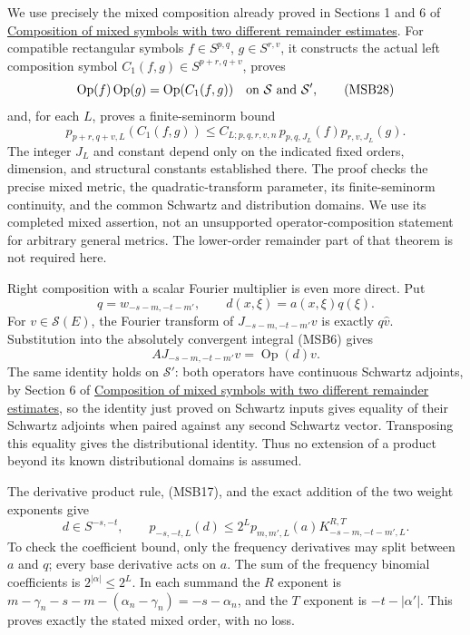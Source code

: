 \documentclass[
  11pt,
]{article}
\begin{document}
We use precisely the mixed composition already proved in Sections 1 and
6 of \href{mixed-symbol-composition.pdf}{Composition of mixed symbols
with two different remainder estimates}. For compatible rectangular
symbols \(f\in S^{p,q}\), \(g\in S^{r,v}\), it constructs the actual
left composition symbol \(C_1(f,g)\in S^{p+r,q+v}\), proves \[
 \operatorname{Op}(f)\operatorname{Op}(g)
       =\operatorname{Op}(C_1(f,g))\quad\hbox{on }\mathcal S\hbox{ and }\mathcal S',
 \tag{MSB28}
\] and, for each \(L\), proves a finite-seminorm bound \[
 p_{p+r,q+v,L}(C_1(f,g))
 \leq C_{L;p,q,r,v,n}\,p_{p,q,J_L}(f)p_{r,v,J_L}(g).
 \tag{MSB29}
\] The integer \(J_L\) and constant depend only on the indicated fixed
orders, dimension, and structural constants established there. The proof
checks the precise mixed metric, the quadratic-transform parameter, its
finite-seminorm continuity, and the common Schwartz and distribution
domains. We use its completed mixed assertion, not an unsupported
operator-composition statement for arbitrary general metrics. The
lower-order remainder part of that theorem is not required here.

Right composition with a scalar Fourier multiplier is even more direct.
Put \[
 q=w_{-s-m,-t-m'},\qquad d(x,\xi)=a(x,\xi)q(\xi).
 \tag{MSB30}
\] For \(v\in\mathcal S(E)\), the Fourier transform of
\(J_{-s-m,-t-m'}v\) is exactly \(q\widehat v\). Substitution into the
absolutely convergent integral (MSB6) gives \[
 A J_{-s-m,-t-m'}v=\operatorname{Op}(d)v.
 \tag{MSB31}
\] The same identity holds on \(\mathcal S'\): both operators have
continuous Schwartz adjoints, by Section 6 of
\href{mixed-symbol-composition.pdf}{Composition of mixed symbols with two
different remainder estimates}, so the identity just proved on Schwartz
inputs gives equality of their Schwartz adjoints when paired against any
second Schwartz vector. Transposing this equality gives the
distributional identity. Thus no extension of a product beyond its known
distributional domains is assumed.

The derivative product rule, (MSB17), and the exact addition of the two
weight exponents give \[
 d\in S^{-s,-t},\qquad
 p_{-s,-t,L}(d)
 \leq2^L p_{m,m',L}(a)K^{R,T}_{-s-m,-t-m',L}.
 \tag{MSB32}
\] To check the coefficient bound, only the frequency derivatives may
split between \(a\) and \(q\); every base derivative acts on \(a\). The
sum of the frequency binomial coefficients is \(2^{|\alpha|}\leq2^L\).
In each summand the \(R\) exponent is
\(m-\gamma_n-s-m-(\alpha_n-\gamma_n)=-s-\alpha_n\), and the \(T\)
exponent is \(-t-|\alpha'|\). This proves exactly the stated mixed
order, with no loss.
\end{document}
